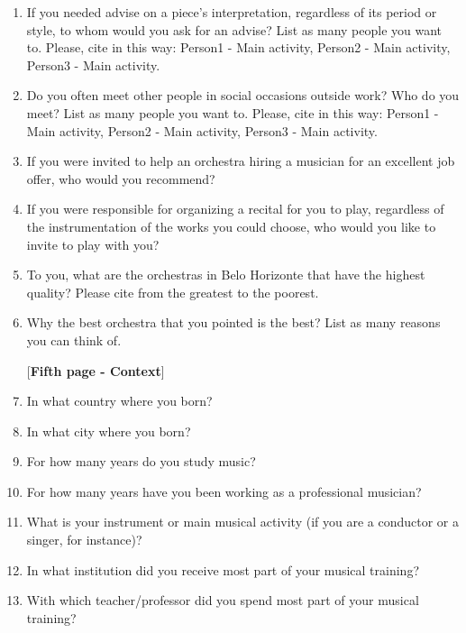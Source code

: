 \documentclass[a4paper, 12pt, openright, oneside, german, french, brazil, english]{abntex2}
\begin{document}
\begin{enumerate}
        \item If you needed advise on a piece's interpretation, regardless of its period or style, to whom would you ask for an advise? List as many people you want to. Please, cite in this way: Person1 - Main activity, Person2 - Main activity, Person3 - Main activity.
        
        \item Do you often meet other people in social occasions outside work? Who do you meet? List as many people you want to. Please, cite in this way: Person1 - Main activity, Person2 - Main activity, Person3 - Main activity.

        \item If you were invited to help an orchestra hiring a musician for an excellent job offer, who would you recommend?

        \item If you were responsible for organizing a recital for you to play, regardless of the instrumentation of the works you could choose, who would you like to invite to play with you?

        \item To you, what are the orchestras in Belo Horizonte that have the highest quality? Please cite from the greatest to the poorest.

        \item Why the best orchestra that you pointed is the best? List as many reasons you can think of.


        

        [\textbf{Fifth page - Context}]
        
        \item In what country where you born?
        \item In what city where you born?
        \item For how many years do you study music?
        \item For how many years have you been working as a professional musician?
        \item What is your instrument or main musical activity (if you are a conductor or a singer, for instance)?
        \item In what institution did you receive most part of your musical training?
        \item With which teacher/professor did you spend most part of your musical training? 


        \end{enumerate}
\end{document}
